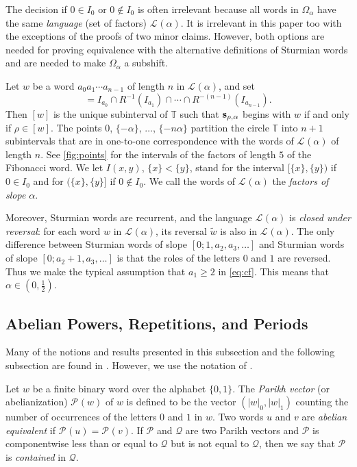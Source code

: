 \documentclass[a4paper,fleqn]{article}
\providecommand{\abs}[1]{\lvert#1\rvert}
\newcommand{\Lang}[2][]{\mathcal{L}_{#1}(#2)}
\newcommand{\infw}[1]{%
  \ifcat\noexpand#1\relax\bm{#1}%
  \else\mathbf{#1}\fi}          %
\newcommand{\mirror}[1]{\widetilde{#1}}
\newcommand{\Parikh}[2][]{\mathcal{P}_{#1}(#2)}
\newcommand{\T}{\mathbb{T}}
\begin{document}
  The decision if $0 \in I_0$ or $0 \notin I_0$ is often irrelevant because all words in $\Omega_\alpha$ have the same
  \emph{language} (set of factors) $\Lang{\alpha}$. It is irrelevant in this paper too with the exceptions of the
  proofs of two minor claims. However, both options are needed for proving equivalence with the alternative definitions
  of Sturmian words and are needed to make $\Omega_\alpha$ a subshift.

  Let $w$ be a word $a_0 a_1 \dotsm a_{n-1}$ of length $n$ in $\Lang{\alpha}$, and set
  \begin{equation*}
    [w] = I_{a_0} \cap R^{-1}(I_{a_1}) \cap \dotsm \cap R^{-(n-1)}(I_{a_{n-1}}).
  \end{equation*}
  Then $[w]$ is the unique subinterval of $\T$ such that $\infw{s}_{\rho,\alpha}$ begins with $w$ if and only if
  $\rho \in [w]$. The points $0$, $\{-\alpha\}$, $\ldots$, $\{-n\alpha\}$ partition the circle $\T$ into $n + 1$
  subintervals that are in one-to-one correspondence with the words of $\Lang{\alpha}$ of length $n$. See
  \autoref{fig:points} for the intervals of the factors of length $5$ of the Fibonacci word. We let $I(x, y)$,
  $\{x\} < \{y\}$, stand for the interval $[\{x\}, \{y\})$ if $0 \in I_0$ and for $(\{x\}, \{y\}]$ if $0 \notin I_0$.
  We call the words of $\Lang{\alpha}$ the \emph{factors of slope $\alpha$}.

  Moreover, Sturmian words are recurrent, and the language $\Lang{\alpha}$ is \emph{closed under reversal}: for each
  word $w$ in $\Lang{\alpha}$, its reversal $\mirror{w}$ is also in $\Lang{\alpha}$. The only difference between
  Sturmian words of slope $[0; 1, a_2, a_3, \ldots]$ and Sturmian words of slope $[0; a_2 + 1, a_3, \ldots]$ is that
  the roles of the letters $0$ and $1$ are reversed. Thus we make the typical assumption that $a_1 \geq 2$ in
  \eqref{eq:cf}. This means that $\alpha \in (0, \tfrac12)$.

  \subsection{Abelian Powers, Repetitions, and Periods}
  Many of the notions and results presented in this subsection and the following subsection are found in
  \cite{2016:abelian_powers_and_repetitions_in_sturmian_words}. However, we use the notation of
  \cite[Ch.~4.7]{diss:jarkko_peltomaki}.

  Let $w$ be a finite binary word over the alphabet $\{0, 1\}$. The \emph{Parikh vector} (or abelianization)
  $\Parikh{w}$ of $w$ is defined to be the vector $(\abs{w}_0, \abs{w}_1)$ counting the number of occurrences of the
  letters $0$ and $1$ in $w$. Two words $u$ and $v$ are \emph{abelian equivalent} if $\Parikh{u} = \Parikh{v}$. If
  $\mathcal{P}$ and $\mathcal{Q}$ are two Parikh vectors and $\mathcal{P}$ is componentwise less than or equal to
  $\mathcal{Q}$ but is not equal to $\mathcal{Q}$, then we say that $\mathcal{P}$ is \emph{contained} in $\mathcal{Q}$.
\end{document}
